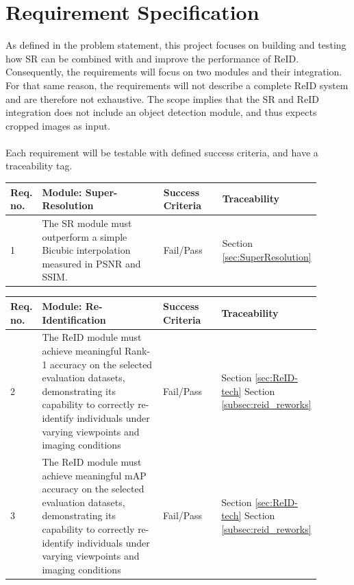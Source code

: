 \chapter{Requirement Specification} 
\label{cha:reqspec}

As defined in the problem statement, this project focuses on building and testing how \acs{SR} can be combined with and improve the performance of \acs{ReID}. Consequently, the requirements will focus on two modules and their integration. For that same reason, the requirements will not describe a complete \acs{ReID} system and are therefore not exhaustive. The scope implies that the \acs{SR} and \acs{ReID} integration does not include an object detection module, and thus expects cropped images as input.
\\\\
Each requirement will be testable with defined success criteria, and have a traceability tag.
\begin{table}[H]
\begin{tabular}{|>{\raggedright\arraybackslash}p{0.1\linewidth}|>{\raggedright\arraybackslash}p{0.45\linewidth}|>{\raggedright\arraybackslash}p{0.2\linewidth}|>{\raggedright\arraybackslash}p{0.15\linewidth}|}\hline
\rowcolor[HTML]{D8E9F7} 
\textbf{Req. no.}& \textbf{Module: Super-Resolution}& \textbf{Success Criteria}& \textbf{Traceability}              \\\hline
 \hypertarget{req:1}{1}& The \acs{SR} module must outperform a simple Bicubic interpolation measured in \acs{PSNR} and \acs{SSIM}.& Fail/Pass&Section \ref{sec:SuperResolution}\\\hline\end{tabular}
\end{table}

\begin{table}[H]
\begin{tabular}{|>{\raggedright\arraybackslash}p{0.1\linewidth}|>{\raggedright\arraybackslash}p{0.45\linewidth}|>{\raggedright\arraybackslash}p{0.2\linewidth}|>{\raggedright\arraybackslash}p{0.15\linewidth}|}\hline
\rowcolor[HTML]{D8E9F7} 
\textbf{Req. no.}& \textbf{Module: Re-Identification}& \textbf{Success Criteria}& \textbf{Traceability}              \\\hline
 \hypertarget{req:2}{2}& The ReID module must achieve meaningful Rank-1 accuracy on the selected evaluation datasets, demonstrating its capability to correctly re-identify individuals under varying viewpoints and imaging conditions& Fail/Pass &Section \ref{sec:ReID-tech}
Section \ref{subsec:reid_reworks}\\\hline
 \hypertarget{req:3}{3} & The ReID module must achieve meaningful mAP accuracy on the selected evaluation datasets, demonstrating its capability to correctly re-identify individuals under varying viewpoints and imaging conditions& Fail/Pass &Section \ref{sec:ReID-tech}
Section \ref{subsec:reid_reworks}\\\hline\end{tabular}
\end{table}

